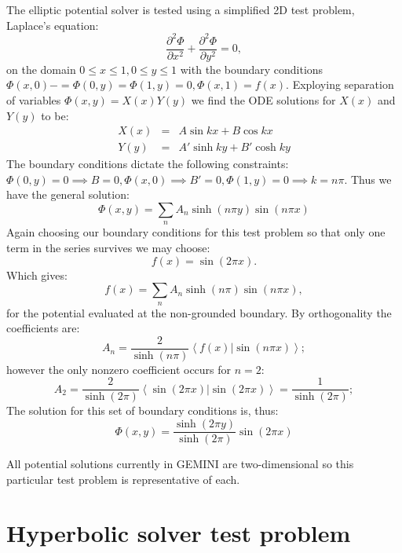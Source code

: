 \documentclass[11pt,letterpaper]{article}
\begin{document}
The elliptic potential solver is tested using a simplified 2D test problem, Laplace's equation:
\begin{equation}
\frac{\partial^2 \Phi}{\partial x^2} + \frac{\partial^2 \Phi}{\partial y^2} = 0, 
\end{equation}
on the domain $0 \le x \le 1, 0 \le y \le 1$ with the boundary conditions $\Phi(x,0)-=\Phi(0,y)=\Phi(1,y)=0, \Phi(x,1)=f(x)$.  Exploying separation of variables $\Phi(x,y)=X(x)Y(y)$ we find the ODE solutions for $X(x)$ and $Y(y)$ to be:
\begin{eqnarray}
X(x) &=& A \sin kx + B \cos kx \\
Y(y) &=& A' \sinh ky + B' \cosh ky
\end{eqnarray}
The boundary conditions dictate the following constraints:  $\Phi(0,y)=0 \implies B=0, \Phi(x,0) \implies B'=0, \Phi(1,y)=0 \implies k=n \pi$.  Thus we have the general solution:
\begin{equation}
\Phi(x,y) = \sum_n A_n \sinh (n \pi y) \sin (n \pi x)
\end{equation}
Again choosing our boundary conditions for this test problem so that only one term in the series survives we may choose:
\begin{equation}
f(x) = \sin(2 \pi x).
\end{equation}
Which gives:
\begin{equation}
f(x) = \sum_n A_n \sinh (n \pi) \sin (n \pi x),
\end{equation}
for the potential evaluated at the non-grounded boundary.  By orthogonality the coefficients are:  
\begin{equation}
A_n = \frac{2}{\sinh (n \pi)} \left< f(x) | \sin (n \pi x) \right>; 
\end{equation}
however the only nonzero coefficient occurs for $n=2$:
\begin{equation}
A_2 = \frac{2}{\sinh (2 \pi)} \left< \sin(2 \pi x) | \sin (2 \pi x) \right> = \frac{1}{\sinh(2 \pi)}; 
\end{equation}
The solution for this set of boundary conditions is, thus: 
\begin{equation}
\Phi(x,y) = \frac{\sinh (2 \pi y)}{\sinh(2 \pi)} \sin (2 \pi x)
\end{equation}

All potential solutions currently in GEMINI are two-dimensional so this particular test problem is representative of each.  


\section{Hyperbolic solver test problem}
\end{document}
